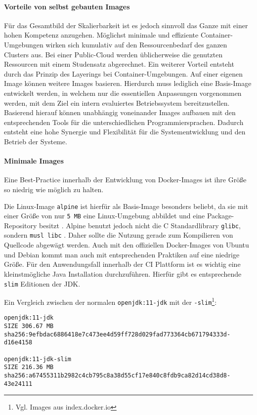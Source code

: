 \paragraph{Vorteile von selbst gebauten Images}
Für das Gesamtbild der Skalierbarkeit ist es jedoch sinnvoll das Ganze mit einer hohen Kompetenz anzugehen. Möglichst minimale und effiziente Container-Umgebungen wirken sich kumulativ auf den Ressourcenbedarf des ganzen Clusters aus. Bei einer Public-Cloud werden üblicherweise die genutzten Ressourcen mit einem Studensatz abgerechnet. Ein weiterer Vorteil entsteht durch das Prinzip des Layerings bei Container-Umgebungen. Auf einer eigenen Image können weitere Images basieren. Hierdurch muss lediglich eine Basis-Image entwickelt werden, in welchem nur die essentiellen Anpassungen vorgenommen werden, mit dem Ziel ein intern evaluiertes Betriebssystem bereitzustellen. Basierend hierauf können unabhängig voneinander Images aufbauen mit den entsprechenden Tools für die unterschiedlichen Programmiersprachen. Dadurch entsteht eine hohe Synergie und Flexibilität für die Systementwicklung und den Betrieb der Systeme.

\paragraph{Minimale Images}
Eine Best-Practice innerhalb der Entwicklung von Docker-Images ist ihre Größe so niedrig wie möglich zu halten. 

Die Linux-Image \lstinline{alpine} ist hierfür als Basis-Image besonders beliebt, da sie mit einer Größe von nur \lstinline{5 MB} eine Linux-Umgebung abbildet und eine Package-Repository besitzt \cite{docker-alpine}. Alpine benutzt jedoch nicht die C Standardlibrary \lstinline{glibc}, sondern \lstinline{musl libc} \cite{alpine-about}. Daher sollte die Nutzung gerade zum Kompilieren von Quellcode abgewägt werden.
Auch mit den offiziellen Docker-Images von Ubuntu und Debian kommt man auch mit entsprechenden Praktiken auf eine niedrige Größe. Für den Anwendungsfall innerhalb der \ac{CI} Plattform ist es wichtig eine kleinstmögliche Java Installation durchzuführen. Hierfür gibt es entsprechende \lstinline{slim} Editionen der JDK. 

Ein Vergleich zwischen der normalen \lstinline{openjdk:11-jdk} mit der \lstinline{-slim}\footnote{Vgl. Images aus index.docker.io}:
\begin{verbatim}
openjdk:11-jdk
SIZE 306.67 MB
sha256:9efbdac6886418e7c473ee4d59ff728d029fad773364cb671794333d-
d16e4158

openjdk:11-jdk-slim
SIZE 216.36 MB
sha256:a67455311b2982c4cb795c8a38d55cf17e840c8fdb9ca82d14cd38d8-
43e24111
\end{verbatim}

